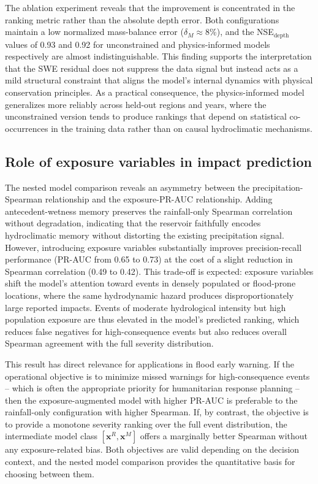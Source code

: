 \documentclass[pdflatex,sn-mathphys-ay]{sn-jnl}
\theoremstyle{thmstyleone}
\theoremstyle{thmstylethree}
\theoremstyle{thmstyletwo}
\begin{document}
The ablation experiment reveals that the improvement is concentrated
in the ranking metric rather than the absolute depth error.  Both
configurations maintain a low normalized mass-balance error
($\delta_M\approx8$\%), and the NSE$_\mathrm{depth}$ values of 0.93
and 0.92 for unconstrained and physics-informed models respectively
are almost indistinguishable.  This finding supports the
interpretation that the SWE residual does not suppress the data
signal but instead acts as a mild structural constraint that aligns
the model's internal dynamics with physical conservation principles.
As a practical consequence, the physics-informed model generalizes
more reliably across held-out regions and years, where the
unconstrained version tends to produce rankings that depend on
statistical co-occurrences in the training data rather than on
causal hydroclimatic mechanisms.

\subsection{Role of exposure variables in impact prediction}

The nested model comparison reveals an asymmetry between the
precipitation-Spearman relationship and the exposure-PR-AUC
relationship.  Adding antecedent-wetness memory preserves the
rainfall-only Spearman correlation without degradation, indicating
that the reservoir faithfully encodes hydroclimatic memory without
distorting the existing precipitation signal.  However, introducing
exposure variables substantially improves precision-recall
performance (PR-AUC from 0.65 to 0.73) at the cost of a slight
reduction in Spearman correlation (0.49 to 0.42).  This trade-off
is expected: exposure variables shift the model's attention toward
events in densely populated or flood-prone locations, where the
same hydrodynamic hazard produces disproportionately large reported
impacts.  Events of moderate hydrological intensity but high
population exposure are thus elevated in the model's predicted
ranking, which reduces false negatives for high-consequence events
but also reduces overall Spearman agreement with the full severity
distribution.

This result has direct relevance for applications in flood early
warning.  If the operational objective is to minimize missed
warnings for high-consequence events -- which is often the
appropriate priority for humanitarian response planning -- then the
exposure-augmented model with higher PR-AUC is preferable to the
rainfall-only configuration with higher Spearman.  If, by contrast,
the objective is to provide a monotone severity ranking over the
full event distribution, the intermediate model class
$[\mathbf{x}^R, \mathbf{x}^M]$ offers a marginally better Spearman
without any exposure-related bias.  Both objectives are valid
depending on the decision context, and the nested model comparison
provides the quantitative basis for choosing between them.
\end{document}
